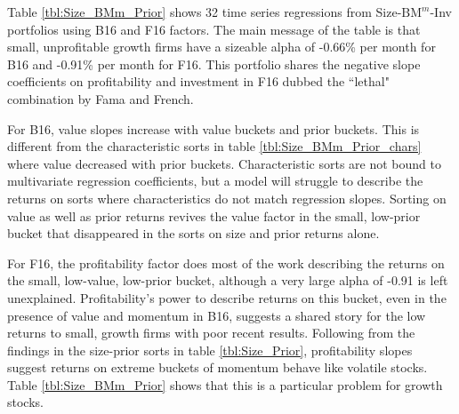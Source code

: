 
Table \ref{tbl:Size_BMm_Prior} shows 32 time series regressions from
Size-$\text{BM}^{m}$-Inv portfolios using B16 and F16 factors.
The main message of the table is that small, unprofitable growth firms have a
sizeable alpha of -0.66\% per month for B16 and -0.91\% per month for F16.
This portfolio shares the negative slope coefficients on profitability and
investment in F16 dubbed the ``lethal" combination by Fama and French.

For B16, value slopes increase with value buckets and prior buckets.
This is different from the characteristic sorts in table
\ref{tbl:Size_BMm_Prior_chars} where value decreased with prior buckets.
Characteristic sorts are not bound to multivariate regression coefficients, but
a model will struggle to describe the returns on sorts where characteristics do
not match regression slopes.
Sorting on value as well as prior returns revives the value factor in the
small, low-prior bucket that disappeared in the sorts on size and prior returns
alone.

For F16, the profitability factor does most of the work describing the returns
on the small, low-value, low-prior bucket, although a very large alpha of -0.91
is left unexplained.
Profitability's power to describe returns on this bucket, even in the presence
of value and momentum in B16, suggests a shared story for the low returns to
small, growth firms with poor recent results.
Following from the findings in the size-prior sorts in table
\ref{tbl:Size_Prior}, profitability slopes suggest returns on extreme buckets
of momentum behave like volatile stocks.
Table \ref{tbl:Size_BMm_Prior} shows that this is a particular problem for
growth stocks.

